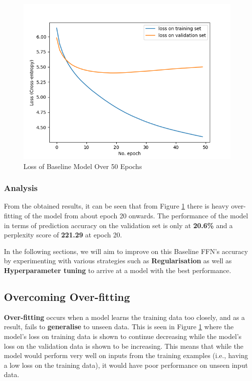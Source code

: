 \documentclass[sigconf,nonacm=true]{acmart}
\begin{document}
\begin{figure}[H]
	\centering
	\includegraphics[scale=0.47]{figures/baseline_adam_loss.png}
	\caption{Loss of Baseline Model Over 50 Epochs}
	\label{fig:baseloss}
\end{figure}

\subsubsection{Analysis}
From the obtained results, it can be seen that from Figure \ref{fig:baseloss} there is heavy over-fitting of the model from about 
epoch 20 onwards. The performance of the model in terms of prediction 
accuracy on the validation set is only at \textbf{20.6\%} and a perplexity score of \textbf{221.29} at epoch 20.

In the following sections, we will aim to improve on this Baseline FFN's accuracy
by experimenting with various strategies such as
\textbf{Regularisation} as well as \textbf{Hyperparameter tuning} to arrive at a
model with the best performance.

\subsection{Overcoming Over-fitting}
\textbf{Over-fitting} occurs when a model learns the training data too closely, and as a result, fails to \textbf{generalise} to unseen data. This is seen in Figure \ref{fig:baseloss} where the model's loss on training data is shown to continue decreasing while the model's loss on the validation data is shown to be increasing. This means that while the model would perform very well on inputs from the training examples (i.e., having a low loss on the training data), it would have poor performance on unseen input data.
\end{document}
